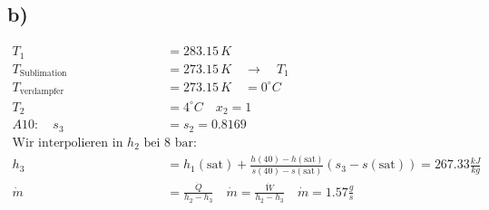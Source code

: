 

\subsection*{b)}

\begin{align*}
T_1 &= 283.15\,K \\
T_{\text{Sublimation}} &= 273.15\,K \quad \rightarrow \quad T_1 \\
T_{\text{verdampfer}} &= 273.15\,K \quad = 0^\circ C \\
T_2 &= 4^\circ C \quad x_2 = 1 \\
A10: \quad s_3 &= s_2 = 0.8169 \\
\text{Wir interpolieren in } h_2 \text{ bei } 8 \text{ bar:} \\
h_3 &= h_1(\text{sat}) + \frac{h(40) - h(\text{sat})}{s(40) - s(\text{sat})} (s_3 - s(\text{sat})) = 267.33 \frac{kJ}{kg} \\
\dot{m} &= \frac{\dot{Q}}{h_2 - h_3} \quad \dot{m} = \frac{\dot{W}}{h_2 - h_3} \quad \dot{m} = 1.57 \frac{g}{s}
\end{align*}